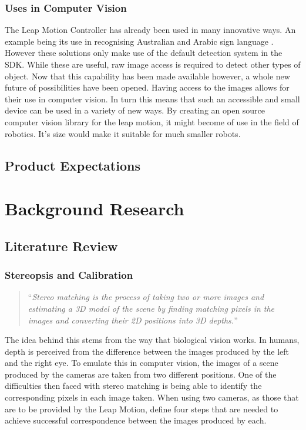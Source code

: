 \documentclass[11pt,oneside]{report}
\begin{document}
			\subsection{Uses in Computer Vision}
				The Leap Motion Controller has already been used in many innovative ways.
				An example being its use in recognising Australian and Arabic sign language \cite{journal:leapSignLanguage,journal:leapSignLanguage2}.
				However these solutions only make use of the default detection system in the SDK.
				While these are useful, raw image access is required to detect other types of object.
				Now that this capability has been made available however, a whole new future of possibilities have been opened.
				Having access to the images allows for their use in computer vision.
				In turn this means that such an accessible and small device can be used in a variety of new ways.
				By creating an open source computer vision library for the leap motion, it might become of use in the field of robotics.
				It's size would make it suitable for much smaller robots.
				
		\section{Product Expectations}
		
	\chapter{Background Research}\label{chap:background}
		\section{Literature Review}
			\subsection{Stereopsis and Calibration}
			\begin{quote}
				``\textit{Stereo matching is the process of taking two or more images and estimating a 3D model of the scene by finding matching pixels in the images and converting their 2D positions into 3D depths.}''\cite{book:sam}
			\end{quote}
			The idea behind this stems from the way that biological vision works.
			In humans, depth is perceived from the difference between the images produced by the left and the right eye.
			To emulate this in computer vision, the images of a scene produced by the cameras are taken from two different positions.
			One of the difficulties then faced with stereo matching is being able to identify the corresponding pixels in each image taken.
			When using two cameras, as those that are to be provided by the Leap Motion,  define four steps that are needed to achieve successful correspondence between the images produced by each.
			
\end{document}
